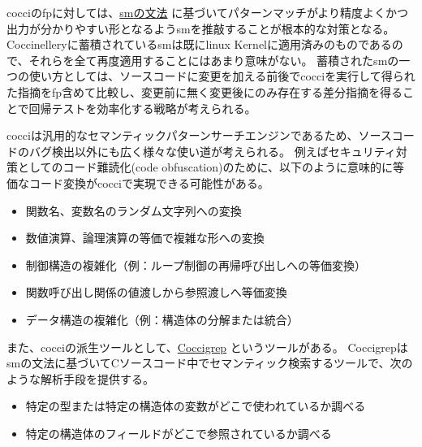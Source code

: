 \acrshort{cocci}の\acrshort{fp}に対しては、\href{http://coccinelle.lip6.fr/docs/main_grammar.pdf}{\acrshort{sm}の文法} \cite{sm}に基づいてパターンマッチがより精度よくかつ出力が分かりやすい形となるよう\acrshort{sm}を推敲することが根本的な対策となる。
Coccinelleryに蓄積されている\acrshort{sm}は既に\acrshort{linux} Kernelに適用済みのものであるので、それらを全て再度適用することにはあまり意味がない。
蓄積された\acrshort{sm}の一つの使い方としては、ソースコードに変更を加える前後で\acrshort{cocci}を実行して得られた指摘を\acrshort{fp}含めて比較し、変更前に無く変更後にのみ存在する差分指摘を得ることで回帰テストを効率化する戦略が考えられる。
\par
\acrshort{cocci}は汎用的なセマンティックパターンサーチエンジンであるため、ソースコードのバグ検出以外にも広く様々な使い道が考えられる。
例えばセキュリティ対策としてのコード難読化(code obfuscation)のために、以下のように意味的に等価なコード変換が\acrshort{cocci}で実現できる可能性がある。
\begin{itemize}
  \item 関数名、変数名のランダム文字列への変換
  \item 数値演算、論理演算の等価で複雑な形への変換
  \item 制御構造の複雑化（例：ループ制御の再帰呼び出しへの等価変換）
  \item 関数呼び出し関係の値渡しから参照渡しへ等価変換
  \item データ構造の複雑化（例：構造体の分解または統合）
\end{itemize}
\par
また、\acrshort{cocci}の派生ツールとして、\href{https://github.com/regit/coccigrep}{Coccigrep} \cite{coccigre}というツールがある。
Coccigrepは\acrshort{sm}の文法に基づいてCソースコード中でセマンティック検索するツールで、次のような解析手段を提供する。
\begin{itemize}
  \item 特定の型または特定の構造体の変数がどこで使われているか調べる
  \item 特定の構造体のフィールドがどこで参照されているか調べる
\end{itemize}
\newpage
